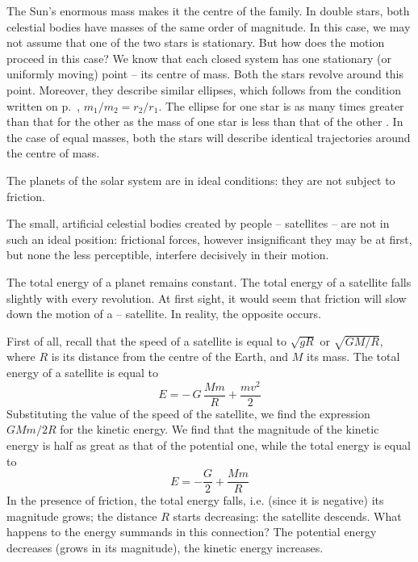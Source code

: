 The Sun's enormous mass makes it the centre of the
family. In double stars, both celestial bodies have masses
of the same order of magnitude. In this case, we may not
assume that one of the two stars is stationary. But how
does the motion proceed in this case? We know that each
closed system has one stationary (or uniformly moving)
point -- its centre of mass. Both the stars revolve around
this point. Moreover, they describe similar ellipses,
which follows from the condition written on p.~\pageref{ellipse},
$m_{1}/m_{2} = r_{2}/r_{1}$. The ellipse for one star is as many times greater than that for the other as the mass of one star
is less than that of the other . In the case of
equal masses, both the stars will describe identical
trajectories around the centre of mass.

The planets of the solar system are in ideal conditions:
they are not subject to friction.

The small, artificial celestial bodies created by people -- satellites -- are not in such an ideal position: frictional
forces, however insignificant they may be at first, but none
the less perceptible, interfere decisively in their motion.

The total energy of a planet remains constant. The
total energy of a satellite falls slightly with every revolution. At first sight, it would seem that friction will slow down the motion of a -- satellite. In reality, the opposite occurs.

First of all, recall that the speed of a satellite is equal to $\sqrt{gR}$ or $\sqrt{GM/R}$, where $R$ is its distance from the
centre of the Earth, and $M$ its mass. The total energy of a satellite is equal to
 \begin{equation*}%
E =   - \, G \, \dfrac{M m}{R} +  \dfrac{mv^{2}}{2} 
 \end{equation*}
Substituting the value of the speed of the satellite,
we find the expression $GMm/2R$ for the kinetic energy.
We find that the magnitude of the kinetic energy is half
as great as that of the potential one, while the total
energy is equal to
 \begin{equation*}%
E = -\dfrac{G}{2} +  \dfrac{Mm}{R} 
 \end{equation*}
In the presence of friction, the total energy falls, i.e.
(since it is negative) its magnitude grows; the distance $R$
starts decreasing: the satellite descends. What happens
to the energy summands in this connection? The potential energy decreases (grows in its magnitude), the kinetic energy increases.


